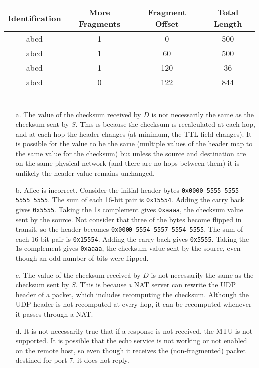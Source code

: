 \documentclass[10pt,a4paper]{article}
\begin{document}
\section{}
\begin{tabular}{c c c c}
    \toprule
    \textbf{Identification} & \textbf{More Fragments} & \textbf{Fragment Offset} & \textbf{Total Length} \\\midrule
    abcd & 1 & 0 & 500 \\
    abcd & 1 & 60 & 500 \\
    abcd & 1 & 120 & 36 \\
    abcd & 0 & 122 & 844 \\\bottomrule
\end{tabular}
\section{}
\begin{itemize}
    \item[a.] The value of the checksum received by $D$ is not necessarily the same as the checksum sent by $S$. This is because the checksum is recalculated at each hop, and at each hop the header changes (at minimum, the TTL field changes). It is possible for the value to be the same (multiple values of the header map to the same value for the checksum) but unless the source and destination are on the same physical network (and there are no hops between them) it is unlikely the header value remains unchanged.
    \item[b.] Alice is incorrect. Consider the initial header bytes \texttt{0x0000 5555 5555 5555 5555}. The sum of each 16-bit pair is \texttt{0x15554}. Adding the carry back gives \texttt{0x5555}. Taking the 1s complement gives \texttt{0xaaaa}, the checksum value sent by the source.
        Not consider that three of the bytes become flipped in transit, so the header becomes \texttt{0x0000 5554 5557 5554 5555}. The sum of each 16-bit pair is \texttt{0x15554}. Adding the carry back gives \texttt{0x5555}. Taking the 1s complement gives \texttt{0xaaaa}, the checksum value sent by the source, even though an odd number of bits were flipped.
    \item[c.] The value of the checksum received by $D$ is not necessarily the same as the checksum sent by $S$. This is because a NAT server can rewrite the UDP header of a packet, which includes recomputing the checksum. Although the UDP header is not recomputed at every hop, it can be recomputed whenever it passes through a NAT.
    \item[d.] It is not necessarily true that if a response is not received, the MTU is not supported. It is possible that the echo service is not working or not enabled on the remote host, so even though it receives the (non-fragmented) packet destined for port 7, it does not reply.
\end{itemize}
\end{document}
